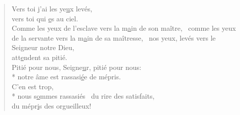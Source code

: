 
\begin{verse}
Vers toi j’ai les ye\underline{u}x levés, \\
vers toi qui \underline{e}s au ciel. \\

Comme les yeux de l’esclave
vers la m\underline{a}in de son maître,~\psalmdagger
comme les yeux de la servante
vers la m\underline{a}in de sa maîtresse,~\psalmstar
nos yeux, levés vers le Seigneur notre Dieu, \\
att\underline{e}ndent sa pitié. \\

Pitié pour nous, Seigne\underline{u}r, pitié pour nous: \\*
notre âme est rassasi\underline{é}e de mépris. \\

C’en est trop, \\*
nous s\underline{o}mmes rassasiés~\psalmstar
du rire des satisfaits, \\
du mépr\underline{i}s des orgueilleux! \\
\end{verse}

